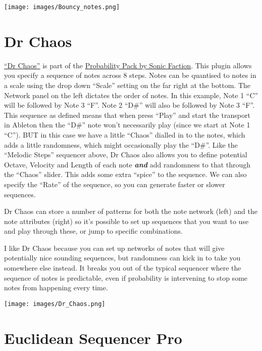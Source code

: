 \documentclass[
  12pt,
  letterpaper,
  oneside,
  open=any]{scrbook}
\begin{document}
\texttt{[image: images/Bouncy\_notes.png]}

\section{Dr Chaos}\label{dr-chaos}

\href{https://www.youtube.com/watch?v=ELMM0IxNVAk}{``Dr Chaos''} is part
of the
\href{https://www.ableton.com/en/packs/probability-pack/}{Probability
Pack by Sonic Faction}. This plugin allows you specify a sequence of
notes across 8 steps. Notes can be quantised to notes in a scale using
the drop down ``Scale'' setting on the far right at the bottom. The
Network panel on the left dictates the order of notes. In this example,
Note 1 ``C'' will be followed by Note 3 ``F''. Note 2 ``D\#'' will also
be followed by Note 3 ``F''. This sequence as defined means that when
press ``Play'' and start the transport in Ableton then the ``D\#'' note
won't necessarily play (since we start at Note 1 ``C''). BUT in this
case we have a little ``Chaos'' dialled in to the notes, which adds a
little randomness, which might occasionally play the ``D\#''. Like the
``Melodic Steps'' sequencer above, Dr Chaos also allows you to define
potential Octave, Velocity and Length of each note \textbf{\emph{and}}
add randomness to that through the ``Chaos'' slider. This adds some
extra ``spice'' to the sequence. We can also specify the ``Rate'' of the
sequence, so you can generate faster or slower sequences.

Dr Chaos can store a number of patterns for both the note network (left)
and the note attributes (right) so it's possible to set up sequences
that you want to use and play through these, or jump to specific
combinations.

I like Dr Chaos because you can set up networks of notes that will give
potentially nice sounding sequences, but randomness can kick in to take
you somewhere else instead. It breaks you out of the typical sequencer
where the sequence of notes is predictable, even if probability is
intervening to stop some notes from happening every time.

\texttt{[image: images/Dr\_Chaos.png]}

\section{Euclidean Sequencer Pro}\label{euclidean-sequencer-pro}
\end{document}
